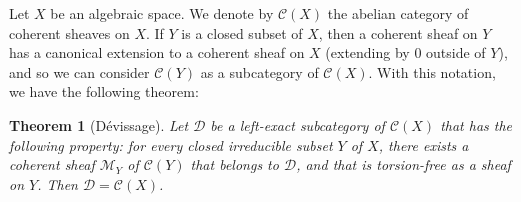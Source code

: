 \documentclass{article}
\theoremstyle{plain}
\newtheorem{theorem}{Theorem}
\theoremstyle{definition}
\newcommand{\sh}{\mathscr}
\newcommand{\cat}{\mathcal}
\newcommand{\oldpage}[1]{\marginpar{\footnotesize$\Big\vert$ \textit{p.~#1}}}
\begin{document}
Let $X$ be an algebraic space.
We denote by $\cat{C}(X)$ the abelian category of coherent sheaves on $X$.
If $Y$ is a closed subset of $X$, then a coherent sheaf on $Y$ has a canonical extension to a coherent sheaf on $X$ (extending by $0$ outside of $Y$), and so we can consider $\cat{C}(Y)$ as a subcategory of $\cat{C}(X)$.
With this notation, we have the following theorem:

\oldpage{4-04}
\begin{theorem}[D\'{e}vissage]
  Let $\cat{D}$ be a left-exact subcategory of $\cat{C}(X)$ that has the following property:
  for every closed irreducible subset $Y$ of $X$, there exists a coherent sheaf $\sh{M}_Y$ of $\cat{C}(Y)$ that belongs to $\cat{D}$, and that is torsion-free as a sheaf on $Y$.
  Then $\cat{D}=\cat{C}(X)$.
\end{theorem}
\end{document}

